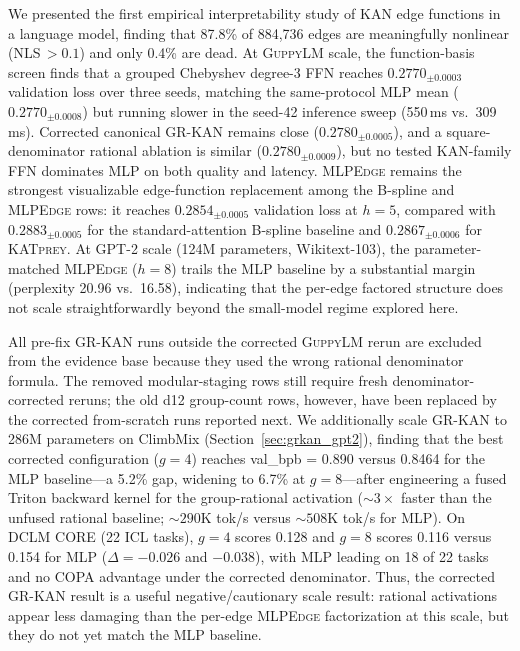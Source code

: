 \documentclass{article}
\newcommand{\mlpedge}{\textsc{MLPEdge}}
\newcommand{\katprey}{\textsc{KATprey}}
\newcommand{\guppylm}{\textsc{GuppyLM}}
\newcommand{\grkan}{\textsc{GR-KAN}}
\begin{document}
We presented the first empirical interpretability study of KAN edge functions
in a language model, finding that 87.8\% of 884,736 edges are meaningfully
nonlinear (NLS\,$>0.1$) and only 0.4\% are dead.
At \guppylm{} scale, the function-basis screen finds that a grouped Chebyshev
degree-3 FFN reaches $0.2770_{\pm 0.0003}$ validation loss over three seeds,
matching the same-protocol MLP mean ($0.2770_{\pm 0.0008}$) but running slower
in the seed-42 inference sweep (550\,ms vs.\ 309\,ms).
Corrected canonical \grkan{} remains close ($0.2780_{\pm 0.0005}$), and a
square-denominator rational ablation is similar ($0.2780_{\pm 0.0009}$), but no
tested KAN-family FFN dominates MLP on both quality and latency.
\mlpedge{} remains the strongest visualizable edge-function replacement among
the B-spline and \mlpedge{} rows: it reaches $0.2854_{\pm 0.0005}$ validation
loss at $h=5$, compared with $0.2883_{\pm 0.0005}$ for the standard-attention
B-spline baseline and $0.2867_{\pm 0.0006}$ for \katprey{}.
At GPT-2 scale (124M parameters, Wikitext-103), the parameter-matched
\mlpedge{} ($h=8$) trails the MLP baseline by a substantial margin
(perplexity 20.96 vs.\ 16.58), indicating that the per-edge factored
structure does not scale straightforwardly beyond the small-model regime
explored here.

All pre-fix \grkan{} runs outside the corrected \guppylm{} rerun are excluded
from the evidence base because they used the wrong rational denominator formula.
The removed modular-staging rows still require fresh denominator-corrected
reruns; the old d12 group-count rows, however, have been replaced by the
corrected from-scratch runs reported next.
We additionally scale \grkan{} to 286M parameters on ClimbMix
(Section~\ref{sec:grkan_gpt2}), finding that the best corrected configuration
($g=4$) reaches val\_bpb = 0.890 versus 0.8464 for the MLP baseline---a 5.2\%
gap, widening to 6.7\% at $g=8$---after
engineering a fused Triton backward kernel for the group-rational activation
(${\sim}3\times$ faster than the unfused rational baseline; ${\sim}290$K
tok/s versus ${\sim}508$K tok/s for MLP).
On DCLM CORE (22 ICL tasks), $g=4$ scores 0.128 and $g=8$ scores 0.116 versus
0.154 for MLP ($\Delta=-0.026$ and $-0.038$), with MLP leading on 18 of 22 tasks
and no COPA advantage
under the corrected denominator.
Thus, the corrected \grkan{} result is a useful negative/cautionary scale
result: rational activations appear less damaging than the per-edge \mlpedge{}
factorization at this scale, but they do not yet match the MLP baseline.
\end{document}
